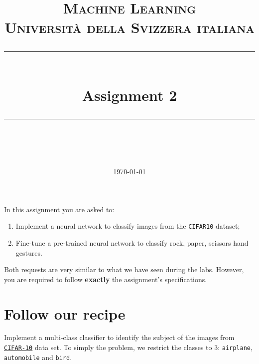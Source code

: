 \documentclass[11pt]{scrartcl}
\title{	
	\normalfont\normalsize
	\textsc{Machine Learning\\%
	Universit\`a della Svizzera italiana}\\
	\vspace{25pt}
	\rule{\linewidth}{0.5pt}\\
	\vspace{20pt}
	{\huge Assignment 2}\\
	\vspace{12pt}
	\rule{\linewidth}{1pt}\\
	\vspace{12pt}
}
\author{\LARGE \thestudent}
\date{\normalsize\today}
\begin{document}
\maketitle

In this assignment you are asked to:

\begin{enumerate}
\item Implement a neural network to classify images from the \texttt{CIFAR10} dataset;
\item Fine-tune a pre-trained neural network to classify rock, paper, scissors hand gestures.
\end{enumerate}

Both requests are very similar to what we have seen during the labs. However, you are required to follow \textbf{exactly} the assignment's specifications.


\section{Follow our recipe}

Implement a multi-class classifier to identify the subject of the images from \href{https://www.cs.toronto.edu/\%7Ekriz/cifar.html}{\texttt{CIFAR-10}} data set. To simply the problem, we restrict the classes to 3: \texttt{airplane}, \texttt{automobile} and \texttt{bird}.
\end{document}
